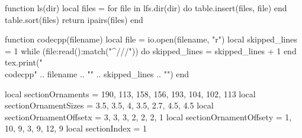 \documentclass[8pt,a4paper,landscape,oneside]{amsart}
\newcommand{\codecpp}[2]{\inputminted[firstline=#2]{cpp}{'\detokenize{#1}'}}
\begin{document}
\begin{multicols*}{3}
\begin{luacode*}

function ls(dir)
    local files = {}
    for file in lfs.dir(dir) do
        table.insert(files, file)
    end
    table.sort(files)
    return ipairs(files)
end

function codecpp(filename)
    local file = io.open(filename, "r")
    local skipped_lines = 1
    while (file:read():match("^///")) do
        skipped_lines = skipped_lines + 1
    end
    tex.print("\\codecpp{" .. filename .. "}{" .. skipped_lines .. "}")
end

local sectionOrnaments = {190, 113, 158, 156, 193, 104, 102, 113}
local sectionOrnamentSizes = {3.5, 3.5, 4, 3.5, 2.7, 4.5, 4.5}
local sectionOrnamentOffsetx = {3, 3, 3, 2, 2, 2, 1}
local sectionOrnamentOffsety = {1, 10, 9, 3, 9, 12, 9}
local sectionIndex = 1


\end{luacode*}
\end{multicols*}
\end{document}
